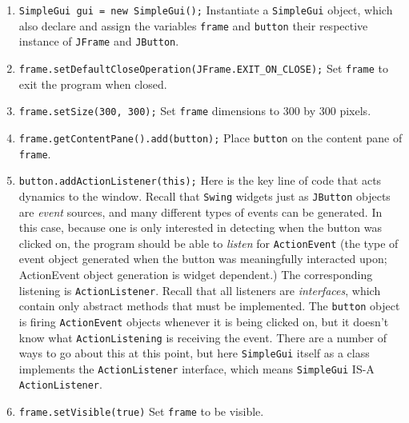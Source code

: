 \documentclass{tufte-handout}
\begin{document}
    \begin{enumerate}
        \item \texttt{SimpleGui gui = new SimpleGui();} \newline
        Instantiate a \texttt{SimpleGui} object, which also declare and assign the variables \texttt{frame} and \texttt{button} their respective instance of \texttt{JFrame} and \texttt{JButton}.
        \item \texttt{frame.setDefaultCloseOperation(JFrame.EXIT\_ON\_CLOSE);} \newline
        Set \texttt{frame} to exit the program when closed.
        \item \texttt{frame.setSize(300, 300);} \newline
        Set \texttt{frame} dimensions to 300 by 300 pixels.
        \item \texttt{frame.getContentPane().add(button);} \newline
        Place \texttt{button} on the content pane of \texttt{frame}.
        \item \texttt{button.addActionListener(this);} \newline
        Here is the key line of code that acts dynamics to the window. Recall that \texttt{Swing} widgets just as \texttt{JButton} objects are \emph{event} sources, and many different types of events can be generated. In this case, because one is only interested in detecting when the button was clicked on, the program should be able to \emph{listen} for \texttt{ActionEvent} (the type of event object generated when the button was meaningfully interacted upon; ActionEvent object generation is widget dependent.) The corresponding listening is \texttt{ActionListener}. Recall that all listeners are \emph{interfaces}, which contain only abstract methods that must be implemented. The \texttt{button} object is firing \texttt{ActionEvent} objects whenever it is being clicked on, but it doesn't know what \texttt{ActionListening} is receiving the event. There are a number of ways to go about this at this point, but here \texttt{SimpleGui} itself as a class implements the \texttt{ActionListener} interface, which means \texttt{SimpleGui} IS-A \texttt{ActionListener}. 
        \item \texttt{frame.setVisible(true)} \newline
        Set \texttt{frame} to be visible.
    \end{enumerate}
\end{document}
